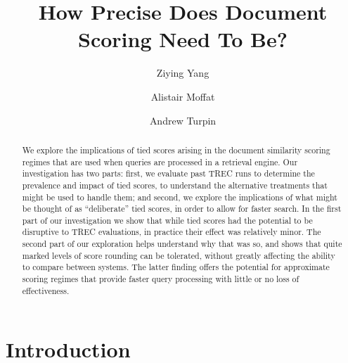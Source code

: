 \documentclass[runningheads,a4paper]{llncs}
\begin{document}
\mainmatter  
\title{How Precise Does Document Scoring Need To Be?}


\author{Ziying Yang \and Alistair Moffat \and Andrew Turpin}



\maketitle

\begin{abstract}
We explore the implications of tied scores arising in the document
similarity scoring regimes that are used when queries are processed
in a retrieval engine.
Our investigation has two parts: first, we evaluate past TREC runs to
determine the prevalence and impact of tied scores, to understand the
alternative treatments that might be used to handle them; and second,
we explore the implications of what might be thought of as
``deliberate'' tied scores, in order to allow for faster search.
In the first part of our investigation we show that while tied scores
had the potential to be disruptive to TREC evaluations, in
practice their effect was relatively minor.
The second part of our exploration helps understand why that was so,
and shows that quite marked levels of score rounding can be
tolerated, without greatly affecting the ability to compare between
systems.
The latter finding offers the potential for approximate scoring
regimes that provide faster query processing with little or no loss
of effectiveness.
\end{abstract}
 \section{Introduction}
\label{sec-intro}
\end{document}
